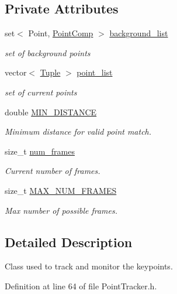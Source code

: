 \subsection*{\-Private \-Attributes}
\begin{DoxyCompactItemize}
\item 
set$<$ \-Point, \hyperlink{struct_point_comp}{\-Point\-Comp} $>$ \hyperlink{class_point_tracker_a7a1f2bb3c992232a04c886cc5bc6c21f}{background\-\_\-list}
\begin{DoxyCompactList}\small\item\em set of background points \end{DoxyCompactList}\item 
vector$<$ \hyperlink{class_tuple}{\-Tuple} $>$ \hyperlink{class_point_tracker_a3c396dbdf7e00c4cce3b371dd5cddd28}{point\-\_\-list}
\begin{DoxyCompactList}\small\item\em set of current points \end{DoxyCompactList}\item 
double \hyperlink{class_point_tracker_a3cbc1fe8d39f2c8183654a67f914fa37}{\-M\-I\-N\-\_\-\-D\-I\-S\-T\-A\-N\-C\-E}
\begin{DoxyCompactList}\small\item\em \-Minimum distance for valid point match. \end{DoxyCompactList}\item 
size\-\_\-t \hyperlink{class_point_tracker_aa32e4991c19d192737ae6d5db32a504a}{num\-\_\-frames}
\begin{DoxyCompactList}\small\item\em \-Current number of frames. \end{DoxyCompactList}\item 
size\-\_\-t \hyperlink{class_point_tracker_acb445ed3b433172cb10172db77ed702a}{\-M\-A\-X\-\_\-\-N\-U\-M\-\_\-\-F\-R\-A\-M\-E\-S}
\begin{DoxyCompactList}\small\item\em \-Max number of possible frames. \end{DoxyCompactList}\end{DoxyCompactItemize}


\subsection{\-Detailed \-Description}
\-Class used to track and monitor the keypoints. 

\-Definition at line 64 of file \-Point\-Tracker.\-h.



